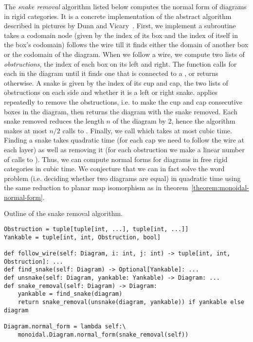The \emph{snake removal} algorithm listed below computes the normal form of diagrams in rigid categories.
It is a concrete implementation of the abstract algorithm described in pictures by Dunn and Vicary~\cite[2.12]{DunnVicary19}.
First, we implement a subroutine  takes a codomain node (given by the index  of its box and the index  of itself in the box's codomain)
follows the wire till it finds either the domain of another box or the codomain of the diagram.
When we follow a wire, we compute two lists of \emph{obstructions}, the index of each box on its left and right.
The  function calls  for each  in the diagram until it finds one that is connected to a , or returns  otherwise.
A  snake is given by the index of its cup and cap, the two lists of obstructions on each side and whether it is a left or right snake.
 applies  repeatedly to remove the obstructions, i.e. to make the cup and cap consecutive boxes in the diagram, then returns the diagram with the snake removed.
Each snake removed reduces the length $n$ of the diagram by 2, hence the  algorithm makes at most $n / 2$ calls to .
Finally, we call  which takes at most cubic time.
Finding a snake takes quadratic time (for each cap we need to follow the wire at each layer) as well as removing it (for each obstruction we make a linear number of calls to ).
Thus, we can compute normal forms for diagrams in free rigid categories in cubic time.
We conjecture that we can in fact solve the word problem (i.e. deciding whether two diagrams are equal) in quadratic time using the same reduction to planar map isomorphism as in theorem~\ref{theorem:monoidal-normal-form}.

\begin{python}\label{listing:snake-removal}
{\normalfont Outline of the snake removal algorithm.}

\begin{verbatim}
Obstruction = tuple[tuple[int, ...], tuple[int, ...]]
Yankable = tuple[int, int, Obstruction, bool]

def follow_wire(self: Diagram, i: int, j: int) -> tuple[int, int, Obstruction]: ...
def find_snake(self: Diagram) -> Optional[Yankable]: ...
def unsnake(self: Diagram, yankable: Yankable) -> Diagram: ...
def snake_removal(self: Diagram) -> Diagram:
    yankable = find_snake(diagram)
    return snake_removal(unsnake(diagram, yankable)) if yankable else diagram

Diagram.normal_form = lambda self:\
    monoidal.Diagram.normal_form(snake_removal(self))
\end{verbatim}
\end{python}

